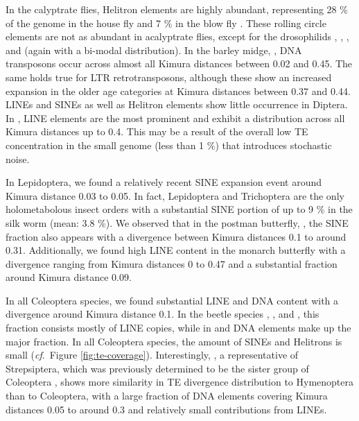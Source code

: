 In the calyptrate flies, Helitron elements are highly abundant,
representing 28 \% of the genome in the house fly 
and 7 \% in the blow fly . These rolling circle
elements are not as abundant in acalyptrate flies, except for the
drosophilids , , , and  (again with a bi-modal
distribution). In the barley midge, , DNA
transposons occur across almost all Kimura distances between 0.02 and
0.45. The same holds true for LTR retrotransposons, although these show
an increased expansion in the older age categories at Kimura distances
between 0.37 and 0.44.  LINEs and SINEs as well as Helitron elements
show little occurrence in Diptera. In , LINE
elements are the most prominent and exhibit a distribution across all
Kimura distances up to 0.4. This may be a result of the overall low TE
concentration in the small  genome (less than 1
\%) that introduces stochastic noise.

In Lepidoptera, we found a relatively recent SINE expansion event around
Kimura distance 0.03 to 0.05. In fact, Lepidoptera and Trichoptera are
the only holometabolous insect orders with a substantial SINE portion of
up to 9 \% in the silk worm  (mean: 3.8 \%). We
observed that in the postman butterfly, ,
the SINE fraction also appears with a divergence between Kimura
distances 0.1 to around 0.31. Additionally, we found high LINE content
in the monarch butterfly  with a divergence
ranging from Kimura distances 0 to 0.47 and a substantial fraction
around Kimura distance 0.09.

In all Coleoptera species, we found substantial LINE and DNA content
with a divergence around Kimura distance 0.1. In the beetle species
, , and
, this fraction consists mostly of LINE
copies, while in  and 
DNA elements make up the major fraction. In all Coleoptera species, the
amount of SINEs and Helitrons is small (\emph{cf}.~Figure
\ref{fig:te-coverage}). Interestingly, , a
representative of Strepsiptera, which was previously determined to be
the sister group of Coleoptera \citep{Niehuis2012}, shows more
similarity in TE divergence distribution to Hymenoptera than to
Coleoptera, with a large fraction of DNA elements covering Kimura
distances 0.05 to around 0.3 and relatively small contributions from
LINEs.

